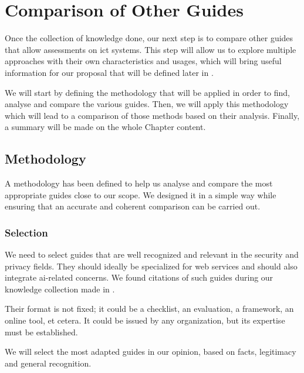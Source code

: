 \chapter{Comparison of Other Guides}
\label{chap:comparison}

Once the collection of knowledge done, our next step is to compare other guides that allow assessments on \gls{ict} systems. This step will allow us to explore multiple approaches with their own characteristics and usages, which will bring useful information for our proposal that will be defined later in .

We will start by defining the methodology that will be applied in order to find, analyse and compare the various guides. Then, we will apply this methodology which will lead to a comparison of those methods based on their analysis. Finally, a summary will be made on the whole Chapter content.
\minitoc

\newpage

\section{Methodology}
\label{sec:comparison_methodology}

A methodology has been defined to help us analyse and compare the most appropriate guides close to our scope. We designed it in a simple way while ensuring that an accurate and coherent comparison can be carried out.

\subsection{Selection}
\label{subsec:comparison_selection}

We need to select guides that are well recognized and relevant in the security and privacy fields. They should ideally be specialized for web services and should also integrate \gls{ai}-related concerns. We found citations of such guides during our knowledge collection made in .

Their format is not fixed; it could be a checklist, an evaluation, a \gls{framework}, an online tool, et cetera. It could be issued by any organization, but its expertise must be established.

We will select the most adapted guides in our opinion, based on facts, legitimacy and general recognition.

